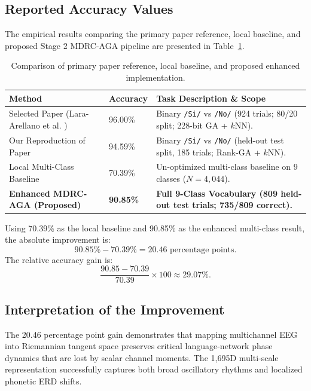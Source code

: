 \documentclass[10pt,twocolumn,a4paper]{article}
\begin{document}
\subsection{Reported Accuracy Values}
The empirical results comparing the primary paper reference, local baseline, and proposed Stage 2 MDRC-AGA pipeline are presented in Table~\ref{tab:results_comparison}.

\begin{table}[H]
\centering
\caption{Comparison of primary paper reference, local baseline, and proposed enhanced implementation.}
\label{tab:results_comparison}
\small
\begin{tabular}{p{2.6cm} p{1.3cm} p{3.4cm}}
\toprule
\textbf{Method} & \textbf{Accuracy} & \textbf{Task Description \& Scope} \\
\midrule
Selected Paper (Lara-Arellano et al. \cite{lara2025feature}) & 96.00\% & Binary \texttt{/Si/} vs \texttt{/No/} (924 trials; 80/20 split; 228-bit GA + $k$NN). \\
Our Reproduction of Paper & 94.59\% & Binary \texttt{/Si/} vs \texttt{/No/} (held-out test split, 185 trials; Rank-GA + $k$NN). \\
Local Multi-Class Baseline & 70.39\% & Un-optimized multi-class baseline on 9 classes ($N=4,044$). \\
\textbf{Enhanced MDRC-AGA (Proposed)} & \textbf{90.85\%} & \textbf{Full 9-Class Vocabulary (809 held-out test trials; 735/809 correct).} \\
\bottomrule
\end{tabular}
\end{table}

Using 70.39\% as the local baseline and 90.85\% as the enhanced multi-class result, the absolute improvement is:
\begin{equation}
90.85\% - 70.39\% = 20.46\text{ percentage points}.
\label{eq:abs_gain}
\end{equation}
The relative accuracy gain is:
\begin{equation}
\frac{90.85 - 70.39}{70.39} \times 100 \approx 29.07\%.
\label{eq:rel_gain}
\end{equation}

\subsection{Interpretation of the Improvement}
The 20.46 percentage point gain demonstrates that mapping multichannel EEG into Riemannian tangent space preserves critical language-network phase dynamics that are lost by scalar channel moments. The 1,695D multi-scale representation successfully captures both broad oscillatory rhythms and localized phonetic ERD shifts.
\end{document}
